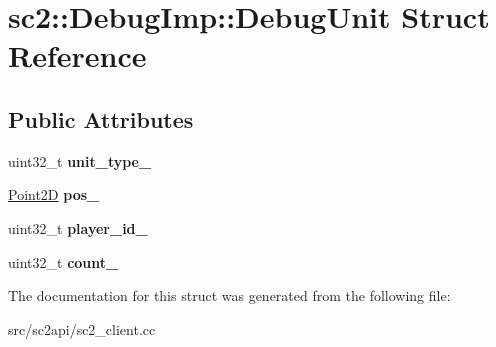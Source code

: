 \hypertarget{structsc2_1_1_debug_imp_1_1_debug_unit}{}\section{sc2\+:\+:Debug\+Imp\+:\+:Debug\+Unit Struct Reference}
\label{structsc2_1_1_debug_imp_1_1_debug_unit}
\subsection*{Public Attributes}
\begin{DoxyCompactItemize}
\item 
\mbox{\label{structsc2_1_1_debug_imp_1_1_debug_unit_a6291c9348344d8944d9bf85c0da60970}} 
uint32\+\_\+t {\bfseries unit\+\_\+type\+\_\+}
\item 
\mbox{\label{structsc2_1_1_debug_imp_1_1_debug_unit_a74965d06a25534b844adeeadac359964}} 
\hyperlink{structsc2_1_1_point2_d}{Point2D} {\bfseries pos\+\_\+}
\item 
\mbox{\label{structsc2_1_1_debug_imp_1_1_debug_unit_a1d904bd796988e32db34bba614784c01}} 
uint32\+\_\+t {\bfseries player\+\_\+id\+\_\+}
\item 
\mbox{\label{structsc2_1_1_debug_imp_1_1_debug_unit_a117c49398b7be272d34b4fb7405bc4aa}} 
uint32\+\_\+t {\bfseries count\+\_\+}
\end{DoxyCompactItemize}


The documentation for this struct was generated from the following file\+:\begin{DoxyCompactItemize}
\item 
src/sc2api/sc2\+\_\+client.\+cc\end{DoxyCompactItemize}
